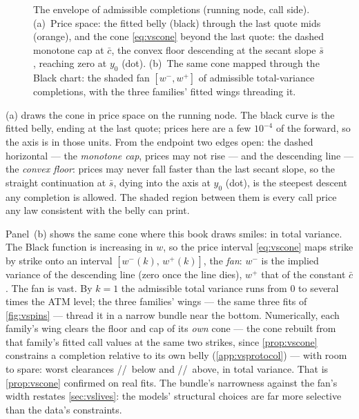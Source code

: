 \begin{figure}[htbp]
\centering
{}
\caption{The envelope of admissible completions (running node, call
side).  (a)~Price space: the fitted belly (black) through the last
quote mids (orange), and the cone \eqref{eq:vscone} beyond the last
quote: the dashed monotone cap at $\bar c$, the convex floor
descending at the secant slope $\bar s$, reaching zero at
$y_0$ (dot).  (b)~The same cone mapped through the Black chart: the
shaded fan $[w^{-},w^{+}]$ of admissible total-variance completions,
with the three families' fitted wings threading it.}
\label{fig:vsenvelope}
\end{figure}

(a) draws the cone in price space on the running
node.  The black curve is the fitted belly, ending at the last quote;
prices here are a few $10^{-4}$ of the forward, so the axis is in
those units.  From the endpoint two edges open: the dashed horizontal
--- the \emph{monotone cap}, prices may not rise --- and the
descending line --- the \emph{convex floor}: prices may never fall
faster than the last secant slope, so the straight continuation at
$\bar s$, dying into the axis at $y_0$ (dot), is the steepest descent
any completion is allowed.  The shaded region between them is every
call price any law consistent with the belly can print.

Panel~(b) shows the same cone where this book draws smiles: in total
variance.  The Black function is increasing in $w$, so the price
interval \eqref{eq:vscone} maps strike by strike onto an interval
$[w^{-}(k),\,w^{+}(k)]$, the \emph{fan}: $w^{-}$ is the implied
variance of the descending line (zero once the line dies), $w^{+}$
that of the constant $\bar c$.  The fan is vast.  By $k=1$ the
admissible total variance runs from $0$ to several times the ATM
level; the three families' wings --- the same three fits of
\cref{fig:vspins} --- thread it in a narrow bundle near the bottom.
Numerically, each family's wing clears the floor and cap of its
\emph{own} cone --- the cone rebuilt from that family's fitted call
values at the same two strikes, since \cref{prop:vscone} constrains a
completion relative to its own belly (\cref{app:vsprotocol}) --- with
room to spare: worst clearances
\MacWingEnvClearLqdLo/\MacWingEnvClearSviLo/\MacWingEnvClearMcsLo\
below and
\MacWingEnvClearLqdHi/\MacWingEnvClearSviHi/\MacWingEnvClearMcsHi\
above, in total variance.  That is \cref{prop:vscone} confirmed on
real fits.
The bundle's narrowness against the fan's width restates
\cref{sec:vslives}: the models' structural choices are far more
selective than the data's constraints.

